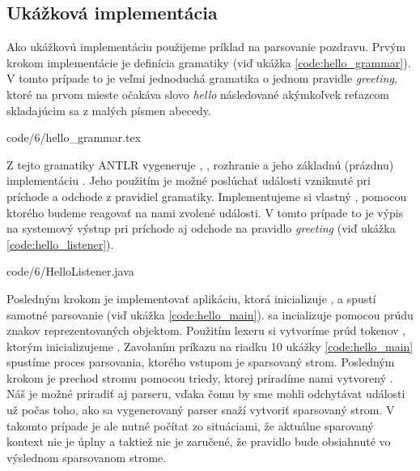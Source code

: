 \subsection{Ukážková implementácia}\label{basic_implementation}
Ako ukážkovú implementáciu použijeme príklad na parsovanie pozdravu. Prvým krokom implementácie je definícia gramatiky (viď ukážka \ref{code:hello_grammar}). V tomto prípade to je veľmi jednoduchá gramatika o jednom pravidle \textit{greeting}, ktoré na prvom mieste očakáva slovo \textit{hello} následované akýmkoľvek reťazcom skladajúcim sa z malých písmen abecedy.


            {code/6/hello_grammar.tex}

Z tejto gramatiky ANTLR vygeneruje , , rozhranie  a jeho základnú (prázdnu) implementáciu . Jeho použitím je možné poslúchať události vzniknuté pri príchode a odchode z pravidiel gramatiky. Implementujeme si vlastný , pomocou ktorého budeme reagovať na nami zvolené události. V tomto prípade to je výpis na systemový výstup pri príchode aj odchode na pravidlo \textit{greeting} (viď ukážka \ref{code:hello_listener}).


            {code/6/HelloListener.java}

Posledným krokom je implementovať aplikáciu, ktorá inicializuje ,  a spustí samotné parsovanie (viď ukážka \ref{code:hello_main}).  sa incializuje pomocou prúdu znakov reprezentovaných  objektom. Použitím lexeru si vytvoríme prúd tokenov , ktorým inicializujeme . Zavolaním príkazu na riadku 10 ukážky \ref{code:hello_main} spustíme proces parsovania, ktorého vstupom je sparsovaný strom. Posledným krokom je prechod stromu pomocou  triedy, ktorej priradíme nami vytvorený . Náš  je možné priradiť aj parseru, vďaka čomu by sme mohli odchytávat události už počas toho, ako sa vygenerovaný parser snaží vytvoriť sparsovaný strom. V takomto prípade je ale nutné počítat zo situáciami, že aktuálne sparovaný kontext nie je úplny a taktiež nie je zaručené, že pravidlo bude obsiahnuté vo výslednom sparsovanom strome. 

